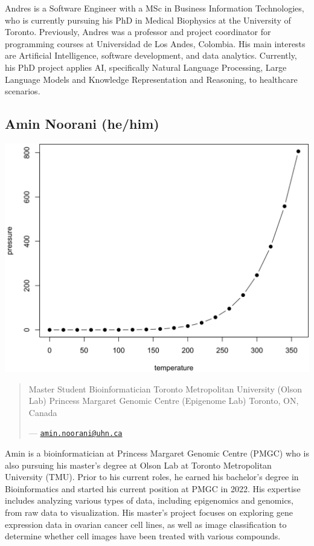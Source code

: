 \documentclass[
]{book}
\theoremstyle{definition}
\theoremstyle{definition}
\theoremstyle{definition}
\theoremstyle{definition}
\theoremstyle{remark}
\begin{document}
Andres is a Software Engineer with a MSc in Business Information Technologies, who is
currently pursuing his PhD in Medical Biophysics at the University of Toronto. Previously,
Andres was a professor and project coordinator for programming courses at Universidad de
Los Andes, Colombia. His main interests are Artificial Intelligence, software development, and
data analytics. Currently, his PhD project applies AI, specifically Natural Language
Processing, Large Language Models and Knowledge Representation and Reasoning, to
healthcare scenarios.

\subsection*{\texorpdfstring{Amin Noorani (he/him) }{Amin Noorani  (he/him) }}\label{amin-noorani-hehim}

\begin{center}\includegraphics[width=0.65\linewidth]{./_main_files/figure-html/nice-fig-1} \end{center}

\begin{quote}
Master Student \textbar{} Bioinformatician
Toronto Metropolitan University (Olson Lab)
Princess Margaret Genomic Centre (Epigenome Lab)
Toronto, ON, Canada

--- \href{mailto:amin.noorani@uhn.ca}{\nolinkurl{amin.noorani@uhn.ca}}
\end{quote}

Amin is a bioinformatician at Princess Margaret Genomic Centre (PMGC) who is also
pursuing his master's degree at Olson Lab at Toronto Metropolitan University (TMU). Prior to
his current roles, he earned his bachelor's degree in Bioinformatics and started his current
position at PMGC in 2022. His expertise includes analyzing various types of data, including
epigenomics and genomics, from raw data to visualization. His master's project focuses on
exploring gene expression data in ovarian cancer cell lines, as well as image classification to
determine whether cell images have been treated with various compounds.
\end{document}
